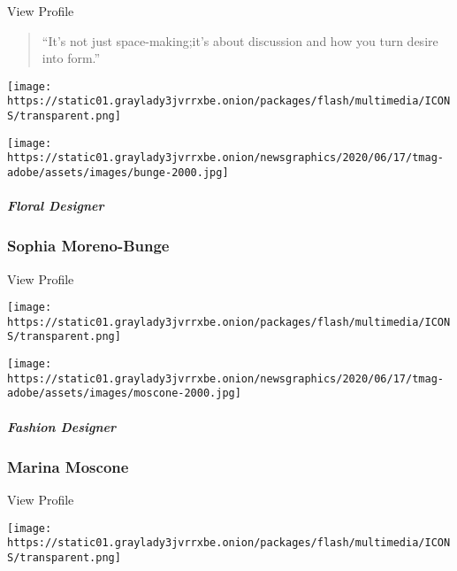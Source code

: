 View Profile

\begin{quote}
``It's not just space-making;it's about discussion and how you turn
desire into form.''
\end{quote}

\href{https://www.nytimes3xbfgragh.onion/2020/08/10/t-magazine/sophia-moreno-bunge-floral-design.html}{}

\texttt{[image: https://static01.graylady3jvrrxbe.onion/packages/flash/multimedia/ICONS/transparent.png]}

\texttt{[image: https://static01.graylady3jvrrxbe.onion/newsgraphics/2020/06/17/tmag-adobe/assets/images/bunge-2000.jpg]}

\href{https://www.nytimes3xbfgragh.onion/2020/08/10/t-magazine/sophia-moreno-bunge-floral-design.html}{}

\hypertarget{floral-designer}{%
\subparagraph{Floral Designer}\label{floral-designer}}

\hypertarget{sophia-moreno-bunge}{%
\subsubsection{Sophia Moreno-Bunge}\label{sophia-moreno-bunge}}

View Profile

\href{https://www.nytimes3xbfgragh.onion/2020/08/10/t-magazine/marina-moscone-fashion-design.html}{}

\texttt{[image: https://static01.graylady3jvrrxbe.onion/packages/flash/multimedia/ICONS/transparent.png]}

\texttt{[image: https://static01.graylady3jvrrxbe.onion/newsgraphics/2020/06/17/tmag-adobe/assets/images/moscone-2000.jpg]}

\href{https://www.nytimes3xbfgragh.onion/2020/08/10/t-magazine/marina-moscone-fashion-design.html}{}

\hypertarget{fashion-designer-3}{%
\subparagraph{Fashion Designer}\label{fashion-designer-3}}

\hypertarget{marina-moscone}{%
\subsubsection{Marina Moscone}\label{marina-moscone}}

View Profile

\href{https://www.nytimes3xbfgragh.onion/2020/08/10/t-magazine/amber-pinkerton-photography.html}{}

\texttt{[image: https://static01.graylady3jvrrxbe.onion/packages/flash/multimedia/ICONS/transparent.png]}


